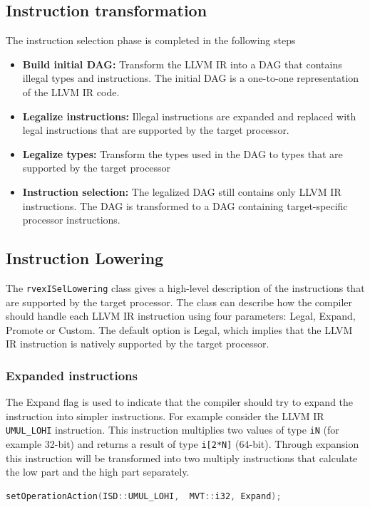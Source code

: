 \subsection{Instruction transformation}
The instruction selection phase is completed in the following steps
\begin{itemize}
  \item \textbf{Build initial DAG:} Transform the LLVM IR into a DAG that contains illegal types and instructions. The initial DAG is a one-to-one representation of the LLVM IR code.
  \item \textbf{Legalize instructions:} Illegal instructions are expanded and replaced with legal instructions that are supported by the target processor.
  \item \textbf{Legalize types:} Transform the types used in the DAG to types that are supported by the target processor 
  \item \textbf{Instruction selection:} The legalized DAG still contains only LLVM IR instructions. The DAG is transformed to a DAG containing target-specific processor instructions.
\end{itemize}

\subsection{Instruction Lowering}
The \texttt{rvexISelLowering} class gives a high-level description of the instructions that are supported by the target processor. The class can describe how the compiler should handle each LLVM IR instruction using four parameters: Legal, Expand, Promote or Custom. The default option is Legal, which implies that the LLVM IR instruction is natively supported by the target processor.

\subsubsection{Expanded instructions}
The Expand flag is used to indicate that the compiler should try to expand the instruction into simpler instructions. 
For example consider the LLVM IR \texttt{UMUL\_LOHI} instruction. This instruction multiplies two values of type \texttt{iN} (for example 32-bit) and returns a result of type \texttt{i[2*N]} (64-bit). Through expansion this instruction will be transformed into two multiply instructions that calculate the low part and the high part separately.

\begin{lstlisting}[language=c] 
setOperationAction(ISD::UMUL_LOHI,  MVT::i32, Expand);
\end{lstlisting}

